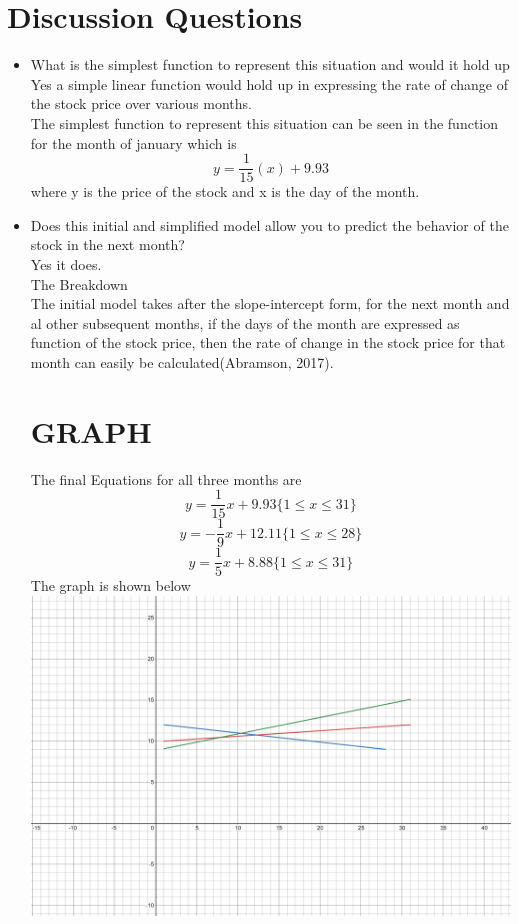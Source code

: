 \documentclass{article}
\begin{document}
\section *{Discussion Questions}
\begin{itemize}
    \item {What is the simplest function to represent this situation and would it hold up}\\
    Yes a simple linear function would hold up in expressing the rate of change of the stock price over various months.\\
    The simplest function to represent this situation can be seen in the function for the month of january which is $${y=\frac{1}{15}(x)+9.93}$$ where y is the price of the stock and x is the day of the month.

    \item {Does this initial and simplified model allow you to predict the behavior of the stock in the next month?}\\
    Yes it does.\\
    The Breakdown\\

    The initial model takes after the slope-intercept form, for the next month and al other subsequent months, if the days of the month are expressed as function of the stock price, then the rate of change in the stock price for that month can easily be calculated(Abramson, 2017).
    \section*{GRAPH}
    The final Equations for all three months are 
    $${y=\frac{1}{15}x + 9.93  \{1\le x \le 31\}}$$
    $${y=-\frac{1}{9}x + 12.11 \{1\le x \le 28\}}$$
    $${y=\frac{1}{5}x + 8.88   \{1\le x \le 31\}}$$
    The graph is shown below\\
    \includegraphics[scale = 0.1]{DAunit2}
    

\end{itemize}
\end{document}
